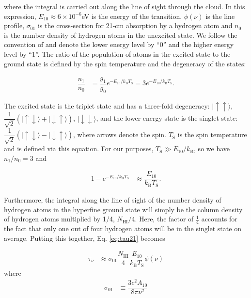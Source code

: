 where the integral is carried out along the line of sight through the cloud. In this expression, $E_{10} \approx 6\times 10^{-6}$eV is the energy of the transition, $\phi(\nu)$ is the line profile, $\sigma_{01}$ is the cross-section for 21-cm absorption by a hydrogen atom and $n_{0}$ is the number density of hydrogen atoms in the unexcited state. We follow the convention of \cite{Furlanetto2006} and denote the lower energy level by ``0'' and the higher energy level by ``1''. The ratio of the population of atoms in the excited state to the ground state is defined by the spin temperature and the degeneracy of the states:

\begin{align}
\dfrac{n_{1}}{n_{0}} &= \dfrac{g_1}{g_0}e^{-E_{10}/k_{\text{B}}T_{\text{S}}} = 3 e^{-E_{10}/k_{\text{B}}T_{\text{S}}}.
\end{align}

The excited state is the triplet state and has a three-fold degeneracy: $|\uparrow \uparrow \rangle$, $\dfrac{1}{\sqrt{2}}(|\uparrow \downarrow\rangle + |\downarrow \uparrow \rangle)$, $|\downarrow \downarrow\rangle$, and the lower-energy state is the singlet state: $\dfrac{1}{\sqrt{2}}( |\uparrow \downarrow\rangle - |\downarrow \uparrow \rangle)$, where arrows denote the spin. $T_{\text{S}}$ is the spin temperature and is defined via this equation. For our purposes, $T_{\text{S}} \gg E_{10}/k_{\text{B}}$, so we have $n_{1}/n_{0} = 3$ and

\begin{align}
1 - e^{-E_{10}/k_{\text{B}}T_{\text{S}}} &\approx \dfrac{E_{10}}{k_{\text{B}}T_{\text{S}}}.
\end{align}


 Furthermore, the integral along the line of sight of the number density of hydrogen atoms in the hyperfine ground state will simply be the column density of hydrogen atoms multiplied by 1/4, $N_{\text{HI}}/4$. Here, the factor of $\frac14$ accounts for the fact that only one out of four hydrogen atoms will be in the singlet state on average. Putting this together, Eq. \ref{eq:tau21} becomes
 
\begin{align}
\tau_{\nu} &\approx \sigma_{01} \dfrac{N_{\text{HI}}}{4} \dfrac{E_{\text{10}}}{k_{\text{B}}T_{\text{S}}} \phi(\nu)
\end{align}
where 
\begin{align}
\sigma_{01} &\equiv \dfrac{3c^2 A_{10}}{8\pi\nu^{2}}
\end{align}

